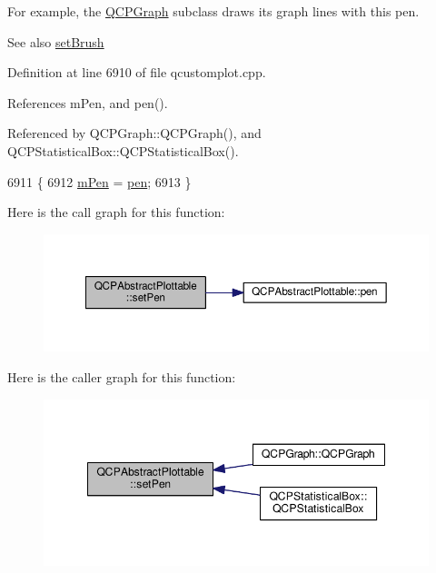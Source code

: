 For example, the \hyperlink{class_q_c_p_graph}{Q\+C\+P\+Graph} subclass draws its graph lines with this pen.

\begin{DoxySeeAlso}{See also}
\hyperlink{class_q_c_p_abstract_plottable_a7a4b92144dca6453a1f0f210e27edc74}{set\+Brush} 
\end{DoxySeeAlso}


Definition at line 6910 of file qcustomplot.\+cpp.



References m\+Pen, and pen().



Referenced by Q\+C\+P\+Graph\+::\+Q\+C\+P\+Graph(), and Q\+C\+P\+Statistical\+Box\+::\+Q\+C\+P\+Statistical\+Box().


\begin{DoxyCode}
6911 \{
6912   \hyperlink{class_q_c_p_abstract_plottable_a67bc0622fd1b9fa14e54c14922dcec66}{mPen} = \hyperlink{class_q_c_p_abstract_plottable_a41d060007cc6b3037c9c04d22d0c0398}{pen};
6913 \}
\end{DoxyCode}


Here is the call graph for this function\+:\nopagebreak
\begin{figure}[H]
\begin{center}
\leavevmode
\includegraphics[width=350pt]{class_q_c_p_abstract_plottable_ab74b09ae4c0e7e13142fe4b5bf46cac7_cgraph}
\end{center}
\end{figure}




Here is the caller graph for this function\+:\nopagebreak
\begin{figure}[H]
\begin{center}
\leavevmode
\includegraphics[width=348pt]{class_q_c_p_abstract_plottable_ab74b09ae4c0e7e13142fe4b5bf46cac7_icgraph}
\end{center}
\end{figure}


